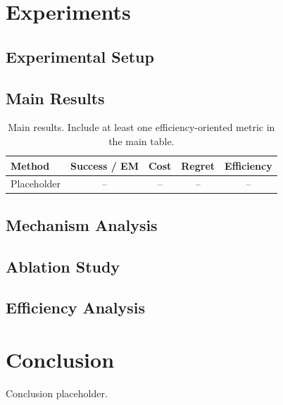 \documentclass{article}
\begin{document}
\section{Experiments}


\subsection{Experimental Setup}


\subsection{Main Results}

\begin{table}[t]
    \centering
    \small
    \caption{Main results. Include at least one efficiency-oriented metric in the main table.}
    \label{tab:main_results}
    \begin{tabular}{lcccc}
        \toprule
        Method & Success / EM & Cost & Regret & Efficiency \\
        \midrule
        Placeholder & -- & -- & -- & -- \\
        \bottomrule
    \end{tabular}
\end{table}

\subsection{Mechanism Analysis}

\subsection{Ablation Study}

\subsection{Efficiency Analysis}


\section{Conclusion}

Conclusion placeholder.

\end{document}
